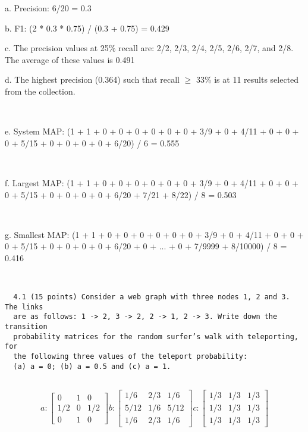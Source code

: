 \documentclass[12pt]{article}
\newcommand{\mt}[1]{\ensuremath{#1}}
\newcommand{\gre}{\mt{\geq} }
\begin{document}
a. Precision: 6/20 = 0.3

b. F1: (2 * 0.3 * 0.75) / (0.3 + 0.75) = 0.429

c. The precision values at 25\% recall are: 2/2, 2/3, 2/4, 2/5, 2/6, 2/7, and 2/8. The average of these values is 0.491

d. The highest precision (0.364) such that recall \gre 33\% is at 11 results selected from the collection.

\

e. System MAP: (1 + 1 + 0 + 0 + 0 + 0 + 0 + 0 + 3/9 + 0 + 4/11 + 0 + 0 + 0 + 5/15 + 0 + 0 + 0 + 0 + 6/20) / 6 = 0.555

\

f. Largest MAP: (1 + 1 + 0 + 0 + 0 + 0 + 0 + 0 + 3/9 + 0 + 4/11 + 0 + 0 + 0 + 5/15 + 0 + 0 + 0 + 0 + 6/20 + 7/21 + 8/22) / 8 = 0.503

\

g. Smallest MAP: (1 + 1 + 0 + 0 + 0 + 0 + 0 + 0 + 3/9 + 0 + 4/11 + 0 + 0 + 0 + 5/15 + 0 + 0 + 0 + 0 + 6/20 + 0 + ... + 0 + 7/9999 + 8/10000) / 8 = 0.416

\

\begin{verbatim}
  4.1 (15 points) Consider a web graph with three nodes 1, 2 and 3. The links
  are as follows: 1 -> 2, 3 -> 2, 2 -> 1, 2 -> 3. Write down the transition
  probability matrices for the random surfer’s walk with teleporting, for
  the following three values of the teleport probability:
  (a) a = 0; (b) a = 0.5 and (c) a = 1.
  
\end{verbatim}

\begin{displaymath} a:
  \begin{bmatrix}
     0 & 1 & 0\\
     1/2 & 0 & 1/2 \\
     0 & 1 & 0  
  \end{bmatrix} b:
  \begin{bmatrix}
     1/6 & 2/3 & 1/6 \\
     5/12 & 1/6 & 5/12 \\
     1/6 & 2/3 & 1/6 
  \end{bmatrix} c:
  \begin{bmatrix}
     1/3 & 1/3 & 1/3 \\
     1/3 & 1/3 & 1/3 \\
     1/3 & 1/3 & 1/3  
  \end{bmatrix}
\end{displaymath}
\end{document}
